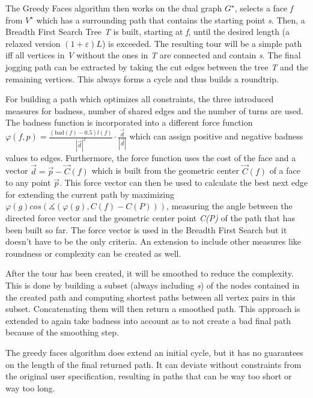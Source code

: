 The Greedy Faces algorithm then works on the dual graph $G^{\star}$, selects a face \textit{f} from $V^{\star}$ which has a surrounding path that contains the starting point \textit{s}. 
Then, a Breadth First Search Tree \textit{T} is built, starting at \textit{f}, until the desired length (a relaxed version $(1 + \varepsilon) L$) is exceeded.
The resulting tour will be a simple path iff all vertices in \textit{V} without the ones in \textit{T} are connected and contain \textit{s}.
The final jogging path can be extracted by taking the cut edges between the tree \textit{T} and the remaining vertices.
This always forms a cycle and thus builds a roundtrip.

For building a path which optimizes all constraints, the three introduced measures for badness, number of shared edges and the number of turns are used.
The badness function is incorporated into a different force function $\varphi (f,p) = \frac{(\text{bad}(f)-0.5)l(f)}{|\vec{d}|^2} \cdot \frac{\vec{d}}{|\vec{d}|}$ which can assign positive and negative badness values to edges.
Furthermore, the force function uses the cost of the face and a vector $\vec{d} = \vec{p} - \vec{C}(f)$ which is built from the geometric center $\vec{C}(f)$ of a face to any point $\vec{p}$. 
This force vector can then be used to calculate the best next edge for extending the current path by maximizing $\varphi(g) cos (\measuredangle (\varphi(g), C(f) - C(P)))$, measuring the angle between the directed force vector and the geometric center point \textit{C(P)} of the path that has been built so far.
The force vector is used in the Breadth First Search but it doesn't have to be the only criteria.
An extension to include other measures like roundness or complexity can be created as well. \cite{gemsa_efficient_2013}
 

After the tour has been created, it will be smoothed to reduce the complexity.
This is done by building a subset (always including \textit{s}) of the nodes contained in the created path and computing shortest paths between all vertex pairs in this subset. 
Concatenating them will then return a smoothed path.
This approach is extended to again take badness into account as to not create a bad final path because of the smoothing step. \cite{gemsa_efficient_2013}

The greedy faces algorithm does extend an initial cycle, but it has no guarantees on the length of the final returned path.
It can deviate without constraints from the original user specification, resulting in paths that can be way too short or way too long. \cite{gemsa_efficient_2013}

